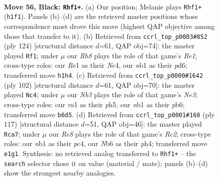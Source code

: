 \documentclass[11pt]{article}
\begin{document}
\clearpage

\begin{figure}[p]\centering
\begin{subfigure}{0.46\textwidth}\centering
\resizebox{\linewidth}{!}{%
\newchessgame
\chessboard[
  setfen={7k/5p1p/1n4p1/p3p1P1/P3P2P/1P3KR1/6P1/RN2r2r b - - 0 56},
  showmover=false,
  pgfstyle=straightmove, color=movearrow, markmove={h1-f1}
]}
\caption{}
\end{subfigure}\hfill
\begin{subfigure}{0.46\textwidth}\centering
\resizebox{\linewidth}{!}{%
\newchessgame
\chessboard[
  setfen={3r4/2k5/r2pRpp1/2pP3n/2N2P1p/2K4P/1P4P1/4R3 w - - 4 63},
  showmover=false,
  pgfstyle=straightmove, color=movearrow, markmove={e1-f1}
]}
\caption{}
\end{subfigure}
\\[4pt]
\begin{subfigure}{0.46\textwidth}\centering
\resizebox{\linewidth}{!}{%
\newchessgame
\chessboard[
  setfen={2R5/2pr1rk1/1pR1p1p1/1P3p1p/3P1P1P/3KN3/6P1/8 w - - 12 52},
  showmover=false,
  pgfstyle=straightmove, color=movearrow, markmove={e3-c4}
]}
\caption{}
\end{subfigure}\hfill
\begin{subfigure}{0.46\textwidth}\centering
\resizebox{\linewidth}{!}{%
\newchessgame
\chessboard[
  setfen={8/2rk4/3p2p1/3P1p2/r1PKpPpP/PRR3P1/8/8 b - - 7 59},
  showmover=false,
  pgfstyle=straightmove, color=movearrow, markmove={c7-a7}
]}
\caption{}
\end{subfigure}
\caption{\textbf{Move 56, Black: \texttt{Rhf1+}.} (a) Our position; Melanie plays \texttt{Rhf1+} (\texttt{h1f1}). Panels (b)--(d) are the retrieved master positions whose correspondence most drove this move (highest QAP objective among those that transfer to it). (b) Retrieved from \texttt{ccrl\_top\_p0003\#852} (ply 124) [structural distance $d$=61, QAP obj=74]: the master played \texttt{Rf1}; under $\mu$ our \emph{Rh8} plays the role of that game's \emph{Re1}; cross-type roles: our \emph{R}e1 as their \emph{N}c4, our \emph{n}b1 as their \emph{p}d6; transferred move \texttt{h1h4}. (c) Retrieved from \texttt{ccrl\_top\_p0000\#1642} (ply 102) [structural distance $d$=61, QAP obj=70]: the master played \texttt{Nc4}; under $\mu$ our \emph{Nb3} plays the role of that game's \emph{Ne3}; cross-type roles: our \emph{r}a1 as their \emph{p}h5, our \emph{n}b1 as their \emph{p}b6; transferred move \texttt{b6d5}. (d) Retrieved from \texttt{ccrl\_top\_p0001\#168} (ply 117) [structural distance $d$=51, QAP obj=46]: the master played \texttt{Rca7}; under $\mu$ our \emph{Re8} plays the role of that game's \emph{Rc2}; cross-type roles: our \emph{n}b1 as their \emph{p}c4, our \emph{N}b6 as their \emph{p}h4; transferred move \texttt{e1g1}. Synthesis: no retrieved analog transferred to \texttt{Rhf1+} -- the \texttt{search} selector chose it on value (material / mate); panels (b)--(d) show the strongest nearby analogies.}
\label{fig:thought-m111}
\end{figure}
\end{document}

